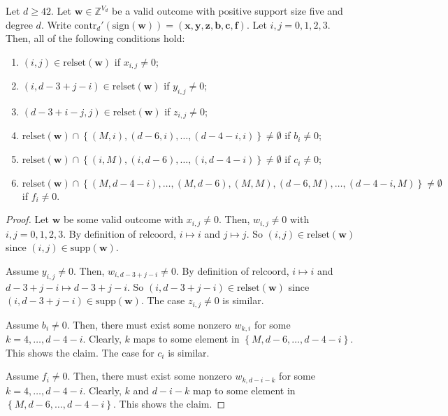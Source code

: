 \begin{proposition}\label{prop:iewjri3j3234212121112}
    Let \( d \geq 42 \). Let \( \mathbf{w} \in \mathbb{Z}^{V_d} \) be a valid outcome with positive support size five and degree \( d \). Write \( \mathrm{contr}_d'(\mathrm{sign}(\mathbf{w})) = (\mathbf{x},\mathbf{y},\mathbf{z},\mathbf{b},\mathbf{c},\mathbf{f} ) \). Let \( i,j = 0,1,2,3 \). Then, all of the following conditions hold:
    \begin{enumerate}
        \item \( (i,j) \in \mathrm{relset}(\mathbf{w}) \) if \( x_{i,j} \neq 0 \);
        \item \( (i, d-3+j-i) \in \mathrm{relset}(\mathbf{w}) \) if \( y_{i,j} \neq 0 \);
        \item \( (d-3+i-j,j) \in \mathrm{relset}(\mathbf{w}) \) if \( z_{i,j} \neq 0 \);
        \item \( \mathrm{relset}(\mathbf{w}) \cap \left\{ (M,i), (d-6, i), \dots, (d-4-i, i) \right\} \neq \emptyset \) if \( b_i \neq 0 \);
        \item \( \mathrm{relset}(\mathbf{w}) \cap \left\{ (i,M), (i, d-6), \dots, (i,d-4-i) \right\} \neq \emptyset \) if \( c_i \neq 0 \);
        \item \( \mathrm{relset}(\mathbf{w}) \cap \left\{ (M, d-4-i), \dots, (M, d-6), (M,M), (d-6, M), \dots, (d-4-i, M) \right\} \neq \emptyset \) if \( f_i \neq 0 \).
    \end{enumerate}
\end{proposition}

\begin{proof}
    Let \( \mathbf{w} \) be some valid outcome with \( x_{i,j} \neq 0 \). Then, \( w_{i,j} \neq 0 \) with \( i,j = 0, 1,2, 3 \). By definition of \( \mathrm{relcoord} \), \( i \mapsto i \) and \( j \mapsto j \). So \( (i,j) \in \mathrm{relset}(\mathbf{w}) \) since \( (i,j) \in \mathrm{supp}(\mathbf{w}) \).

    Assume \( y_{i,j} \neq 0 \). Then, \( w_{i, d-3+j-i} \neq 0 \). By definition of \( \mathrm{relcoord} \), \( i \mapsto i \) and \( d-3+j-i \mapsto d-3+j-i \). So \( (i,d-3+j-i) \in \mathrm{relset}(\mathbf{w}) \) since \( (i,d-3+j-i) \in \mathrm{supp}(\mathbf{w}) \). The case \( z_{i,j} \neq 0 \) is similar.

    Assume \( b_{i} \neq 0 \). Then, there must exist some nonzero \( w_{k, i} \) for some \( k = 4, \dots, d-4-i \). Clearly, \( k \) maps to some element in \( \left\{ M, d-6, \dots, d-4-i \right\} \). This shows the claim. The case for \( c_i \) is similar.

    Assume \( f_{i} \neq 0 \). Then, there must exist some nonzero \( w_{k, d-i-k} \) for some \( k = 4, \dots, d-4-i \). Clearly, \( k \) and \( d-i-k \)  map to some element in \( \left\{ M, d-6, \dots, d-4-i \right\} \). This shows the claim.
\end{proof}

